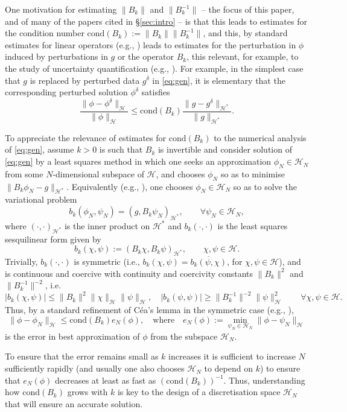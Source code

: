 \documentclass{birkjour}
\theoremstyle{definition}
\theoremstyle{remark}
\numberwithin{equation}{section}
\newcommand{\cH}{\mathcal{H}}
\newcommand{\cond}{\mathrm{cond}}
\begin{document}
One motivation for estimating $\|B_k\|$ and $\|B_k^{-1}\|$ -- the focus of this paper, and of many of the papers cited in \S\ref{sec:intro} -- is that this leads to estimates for the condition number $\cond(B_k):= \|B_k\|\|B_k^{-1}\|$, and this, by standard estimates for linear operators (e.g., \cite[\S2.7.2]{GVL}) leads to estimates for the perturbation in $\phi$ induced by perturbations in $g$ or the operator $B_k$, this relevant, for  example, to the study of uncertainty quantification (e.g.,  \cite{UQ2,UQ1}). For example, in the simplest case that $g$ is replaced by perturbed data $g^\delta$ in \eqref{eq:gen}, it is elementary that the corresponding perturbed solution $\phi^\delta$ satisfies
$$
\frac{\|\phi-\phi^\delta\|_\cH}{\|\phi\|_\cH} \leq \cond(B_k) \frac{\|g-g^\delta\|_{\cH^*}}{\|g\|_{\cH^*}}.
$$ 

To appreciate the relevance of estimates for $\cond(B_k)$ to the numerical analysis of \eqref{eq:gen}, assume $k>0$ is such that $B_k$ is invertible and consider solution of \eqref{eq:gen} by a least squares method in which one seeks an approximation $\phi_N\in \cH_N$ from some $N$-dimensional subspace of $\cH$, and chooses $\phi_N$ so as to minimise $\|B_k\phi_N-g\|_{\cH^*}$. Equivalently (e.g., \cite[\S3.2.1]{Kirsch}), one chooses $\phi_N \in \cH_N$ so as to solve the variational problem
\begin{equation} \label{eq:ls}
b_k(\phi_N,\psi_N)=(g,B_k\psi_N)_{\cH^*}, \qquad \forall \psi_N\in \cH_N,
\end{equation}
where $(\cdot,\cdot)_{\cH^*}$ is the inner product on $\cH^*$ and $b_k(\cdot,\cdot)$ is the least squares sesquilinear form given by
$$
b_k(\chi,\psi):=(B_k \chi,B_k\psi)_{\cH^*}, \qquad  \chi, \psi\in \cH.
$$
Trivially, $b_k(\cdot,\cdot)$ is symmetric (i.e., $b_k(\chi,\psi)=\overline{b_k(\psi,\chi)}$, for $\chi,\psi\in \cH$), and is continuous and coercive with continuity and coercivity constants $\|B_k\|^2$ and $\|B_k^{-1}\|^{-2}$, i.e.
$$
|b_k(\chi,\psi)| \leq \|B_k\|^2 \|\chi\|_\cH \|\psi\|_{\cH}, \quad |b_k(\psi,\psi)| \geq \|B_k^{-1}\|^{-2}\|\psi\|_{\cH}^2 \qquad \forall \chi, \psi\in \cH.
$$
Thus, by a standard refinement of C\'ea's lemma in the symmetric case (e.g., \cite[(2.8.5), Rem.~2]{BrSc:08}),
$$
\|\phi -\phi_N\|_\cH \leq \cond(B_k) e_N(\phi), \quad \mbox{where} \quad e_N(\phi):= \min_{\psi_N\in \cH_N} \|\phi-\psi_N\|_\cH
$$
is the error in best approximation of $\phi$ from the subspace $\cH_N$. 

To ensure that the error remains small as $k$ increases it is sufficient to increase $N$ sufficiently rapidly (and usually one also chooses $\cH_N$ to depend on $k$) to ensure that $e_N(\phi)$ decreases at least as fast as $(\cond(B_k))^{-1}$. Thus, understanding how $\cond(B_k)$ grows with $k$ is key to the design of a discretisation space $\cH_N$ that will ensure an accurate solution. 
\end{document}
